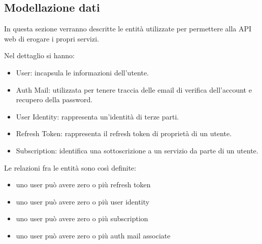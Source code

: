 \subsection{Modellazione dati}
In questa sezione verranno descritte le entità utilizzate per permettere alla API web di erogare i propri servizi.

Nel dettaglio si hanno:
\begin{itemize}
    \item User: incapsula le informazioni dell'utente.
    \item Auth Mail: utilizzata per tenere traccia delle email di verifica dell'account e recupero della password.
    \item User Identity: rappresenta un'identità di terze parti.
    \item Refresh Token: rappresenta il refresh token di proprietà di un utente.
    \item Subscription: identifica una sottoscrizione a un servizio da parte di un utente.
\end{itemize}

Le relazioni fra le entità sono così definite:
\begin{itemize}
    \item uno user può avere zero o più refresh token
    \item uno user può avere zero o più user identity
    \item uno user può avere zero o più subscription
    \item uno user può avere zero o più auth mail associate
\end{itemize}



